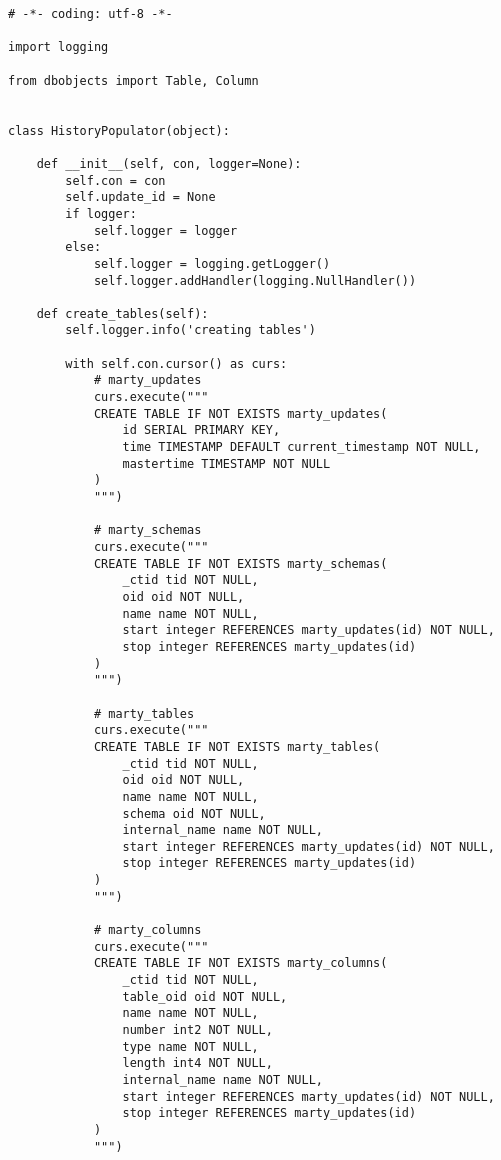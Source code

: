 \begin{lstlisting}[caption={utils/populator.py}]
# -*- coding: utf-8 -*-

import logging

from dbobjects import Table, Column


class HistoryPopulator(object):

    def __init__(self, con, logger=None):
        self.con = con
        self.update_id = None
        if logger:
            self.logger = logger
        else:
            self.logger = logging.getLogger()
            self.logger.addHandler(logging.NullHandler())

    def create_tables(self):
        self.logger.info('creating tables')

        with self.con.cursor() as curs:
            # marty_updates
            curs.execute("""
            CREATE TABLE IF NOT EXISTS marty_updates(
                id SERIAL PRIMARY KEY,
                time TIMESTAMP DEFAULT current_timestamp NOT NULL,
                mastertime TIMESTAMP NOT NULL
            )
            """)

            # marty_schemas
            curs.execute("""
            CREATE TABLE IF NOT EXISTS marty_schemas(
                _ctid tid NOT NULL,
                oid oid NOT NULL,
                name name NOT NULL,
                start integer REFERENCES marty_updates(id) NOT NULL,
                stop integer REFERENCES marty_updates(id)
            )
            """)

            # marty_tables
            curs.execute("""
            CREATE TABLE IF NOT EXISTS marty_tables(
                _ctid tid NOT NULL,
                oid oid NOT NULL,
                name name NOT NULL,
                schema oid NOT NULL,
                internal_name name NOT NULL,
                start integer REFERENCES marty_updates(id) NOT NULL,
                stop integer REFERENCES marty_updates(id)
            )
            """)

            # marty_columns
            curs.execute("""
            CREATE TABLE IF NOT EXISTS marty_columns(
                _ctid tid NOT NULL,
                table_oid oid NOT NULL,
                name name NOT NULL,
                number int2 NOT NULL,
                type name NOT NULL,
                length int4 NOT NULL,
                internal_name name NOT NULL,
                start integer REFERENCES marty_updates(id) NOT NULL,
                stop integer REFERENCES marty_updates(id)
            )
            """)


\end{lstlisting}
